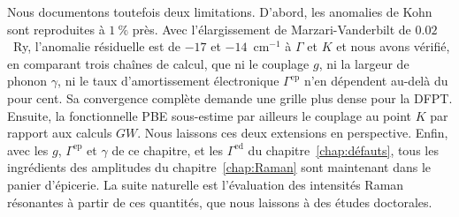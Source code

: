 Nous documentons toutefois deux limitations. D'abord, les anomalies de Kohn sont reproduites à $1~\%$ près. Avec l'élargissement de Marzari-Vanderbilt de $0.02$~Ry, l'anomalie résiduelle est de $-17$ et $-14$~cm$^{-1}$ à $\Gamma$ et $K$ et nous avons vérifié, en comparant trois chaînes de calcul, que ni le couplage $g$, ni la largeur de phonon $\gamma$, ni le taux d'amortissement électronique $\Gamma^\text{ep}$ n'en dépendent au-delà du pour cent. Sa convergence complète demande une grille plus dense pour la DFPT. Ensuite, la fonctionnelle PBE sous-estime par ailleurs le couplage au point $K$ par rapport aux calculs $GW$. Nous laissons ces deux extensions en perspective. Enfin, avec les $g$, $\Gamma^\text{ep}$ et $\gamma$ de ce chapitre, et les $\Gamma^\text{ed}$ du chapitre~\ref{chap:défauts}, tous les ingrédients des amplitudes du chapitre~\ref{chap:Raman} sont maintenant dans le panier d'épicerie. La suite naturelle est l'évaluation des intensités Raman résonantes à partir de ces quantités, que nous laissons à des études doctorales.